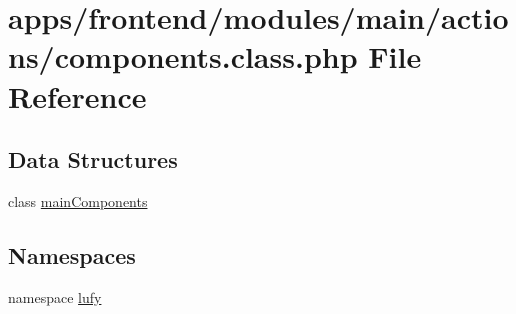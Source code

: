 \hypertarget{frontend_2modules_2main_2actions_2components_8class_8php}{\section{apps/frontend/modules/main/actions/components.class.\-php File Reference}
\label{frontend_2modules_2main_2actions_2components_8class_8php}
}
\subsection*{Data Structures}
\begin{DoxyCompactItemize}
\item 
class \hyperlink{classmain_components}{main\-Components}
\end{DoxyCompactItemize}
\subsection*{Namespaces}
\begin{DoxyCompactItemize}
\item 
namespace \hyperlink{namespacelufy}{lufy}
\end{DoxyCompactItemize}
